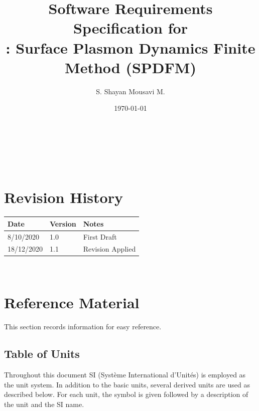 \documentclass[12pt]{article}
\begin{document}
	
	\title{Software Requirements Specification for\\ \progname: Surface Plasmon
		Dynamics Finite Method (SPDFM)} \author{S. Shayan Mousavi M.} \date{\today}
	
	\maketitle
	
	~\newpage
	
	
	\tableofcontents
	
	~\newpage
	
	\section*{Revision History}
	
	\begin{tabularx}{\textwidth}{p{3cm}p{2cm}X} \toprule {\bf Date} & {\bf Version}
		& {\bf Notes}\\ \midrule 8/10/2020 & 1.0 & First Draft\\ 18/12/2020 & 1.1 &
		Revision Applied\\ \bottomrule \end{tabularx}
	
	~\newpage
	
	\section{Reference Material}
	
	This section records information for easy reference.
	
	\subsection{Table of Units}
	
	Throughout this document SI (Syst\`{e}me International d'Unit\'{e}s) is
	employed as the unit system.  In addition to the basic units, several derived
	units are used as described below.  For each unit, the symbol is given followed
	by a description of the unit and the SI name. ~\newline
	
\end{document}
